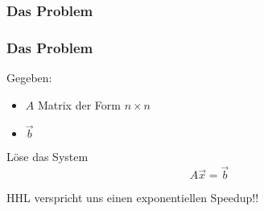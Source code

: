 \subsubsection{Das Problem}
    \begin{frame}
        \frametitle{Das Problem}

        Gegeben: 
        \begin{itemize}
            \item $A$ Matrix der Form $n \times n$
            \item $\vec{b}$
       \end{itemize}

       \hfill

       Löse das System
        $$A \vec{x} = \vec{b}$$

    

        HHL verspricht uns einen exponentiellen Speedup!!

    \end{frame}


        
